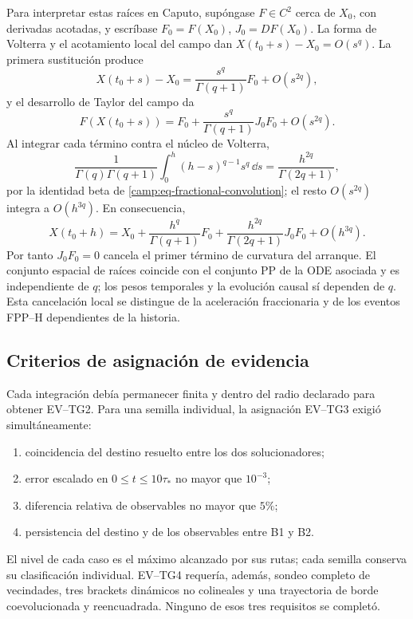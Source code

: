 Para interpretar estas raíces en Caputo, supóngase \(F\in C^2\) cerca de
\(X_0\), con derivadas acotadas, y escríbase \(F_0=F(X_0)\),
\(J_0=DF(X_0)\). La forma de Volterra y el acotamiento local del campo dan
\(X(t_0+s)-X_0=O(s^q)\). La primera sustitución produce
\[
 X(t_0+s)-X_0=\frac{s^q}{\Gamma(q+1)}F_0+O(s^{2q}),
\]
y el desarrollo de Taylor del campo da
\[
 F(X(t_0+s))=F_0+
 \frac{s^q}{\Gamma(q+1)}J_0F_0+O(s^{2q}).
\]
Al integrar cada término contra el núcleo de Volterra,
\[
 \frac1{\Gamma(q)\Gamma(q+1)}
 \int_0^h(h-s)^{q-1}s^q\,\dd s
 =\frac{h^{2q}}{\Gamma(2q+1)},
\]
por la identidad beta de \cref{camp:eq-fractional-convolution}; el resto
\(O(s^{2q})\) integra a \(O(h^{3q})\). En consecuencia,
\begin{equation}
 X(t_0+h)=X_0+
 \frac{h^q}{\Gamma(q+1)}F_0+
 \frac{h^{2q}}{\Gamma(2q+1)}J_0F_0+O(h^{3q}).
 \label{pilot:eq-wu-picard-expansion}
\end{equation}
Por tanto $J_0F_0=0$ cancela el primer término de curvatura del arranque. El
conjunto espacial de raíces coincide con el conjunto PP de la ODE asociada y
es independiente de $q$; los pesos temporales y la evolución causal sí dependen
de $q$. Esta cancelación local se distingue de la aceleración fraccionaria
y de los eventos FPP--H dependientes de la historia.

\subsection{Criterios de asignación de evidencia}
\label{subsec:pilot-gates}

Cada integración debía permanecer finita y dentro del radio declarado para obtener
EV--TG2. Para una semilla individual, la asignación EV--TG3 exigió
simultáneamente:
\begin{enumerate}
 \item coincidencia del destino resuelto entre los dos solucionadores;
 \item error escalado en $0\le t\le10\tau_*$ no mayor que $10^{-3}$;
 \item diferencia relativa de observables no mayor que $5\%$;
 \item persistencia del destino y de los observables entre B1 y B2.
\end{enumerate}
El nivel de cada caso es el máximo alcanzado por sus rutas; cada semilla
conserva su clasificación individual. EV--TG4 requería,
además, sondeo completo de vecindades, tres brackets dinámicos no colineales y
una trayectoria de borde coevolucionada y reencuadrada. Ninguno de esos tres
requisitos se completó.


